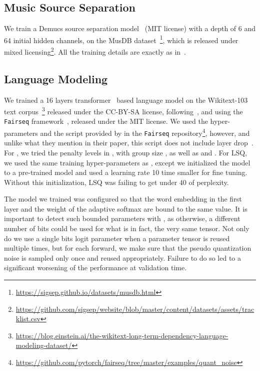 \subsection{Music Source Separation}

We train a Demucs source separation model~\citep{defossez2019music} (MIT license) with a depth of 6 and 64 initial hidden channels, on the MusDB dataset~\citep{musdb}\footnote{\url{https://sigsep.github.io/datasets/musdb.html}}, which is released under mixed licensing\footnote{\url{https://github.com/sigsep/website/blob/master/content/datasets/assets/tracklist.csv}}. 
All the training details are exactly as in~\citep{defossez2019music}.

\subsection{Language Modeling}

We trained a 16 layers transformer~\citep{vaswani2017attention} based language model on the Wikitext-103 text corpus~\citep{merity2016pointer}\footnote{\url{https://blog.einstein.ai/the-wikitext-long-term-dependency-language-modeling-dataset/}} released under the CC-BY-SA license,
following~\citet{baevski2018adaptive},
 and using the \texttt{Fairseq} framework~\citep{ott2019fairseq}, released under the MIT license. 
 We used the hyper-parameters and the script provided by \citep{fan2020training} in the \texttt{Fairseq} repository\footnote{\url{https://github.com/pytorch/fairseq/tree/master/examples/quant_noise}}, however, and unlike what they mention in their paper, this script does not include layer drop~\citep{fan2019reducing}.
 For \diffq, we tried the penalty levels  in , with group size , as well as  and .
 For LSQ, we used the same training hyper-parameters as \diffq, except we initialized the model
 to a pre-trained model and used a learning rate 10 time smaller for fine tuning. Without this initialization, LSQ was failing to get under 40 of perplexity.

The model we trained was configured so that the word embedding in the first layer and the weight of the adaptive softmax are bound to the same value. It is important to detect such bounded parameters with \diffq, as otherwise, a different number of bits could be used for what is in fact, the very same tensor. Not only do we use a single bits logit parameter
when a parameter tensor is reused multiple times, but for each forward, we make sure that the pseudo quantization noise
is sampled only once and reused appropriately. Failure to do so led to a significant worsening of the performance
at validation time.


